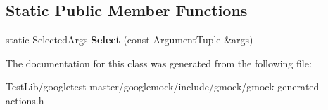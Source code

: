 \subsection*{Static Public Member Functions}
\begin{DoxyCompactItemize}
\item 
\mbox{\label{classtesting_1_1internal_1_1SelectArgs_3_01Result_00_01ArgumentTuple_00_01k1_00_01k2_00_01k3_00_39929402cb68b57f60e280a41eb60fed_a0cf7d28342dd284de849c9776387c192}} 
static Selected\+Args {\bfseries Select} (const Argument\+Tuple \&args)
\end{DoxyCompactItemize}


The documentation for this class was generated from the following file\+:\begin{DoxyCompactItemize}
\item 
Test\+Lib/googletest-\/master/googlemock/include/gmock/gmock-\/generated-\/actions.\+h\end{DoxyCompactItemize}
